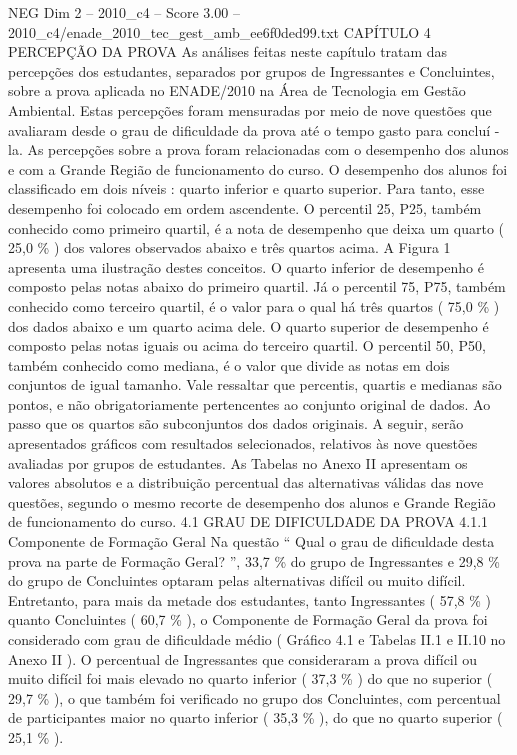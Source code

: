 \begin{textsample}{NEG Dim 2 – 2010\_c4 – Score 3.00 – 2010\_c4/enade\_2010\_tec\_gest\_amb\_ee6f0ded99.txt}  \label{ex:f2_neg_285}
CAPÍTULO 4 PERCEPÇÃO DA PROVA As análises feitas neste capítulo tratam das percepções dos estudantes, separados por grupos de Ingressantes e Concluintes, sobre a prova aplicada no ENADE/2010 na Área de Tecnologia em Gestão Ambiental.
Estas percepções foram mensuradas por meio de nove questões que avaliaram desde o grau de dificuldade da prova até o tempo gasto para concluí -la.
As percepções sobre a prova foram relacionadas com o desempenho dos alunos e com a Grande Região de funcionamento do curso.
O desempenho dos alunos foi classificado em dois níveis : quarto inferior e quarto superior.
Para tanto, esse desempenho foi colocado em ordem ascendente.
O percentil 25, P25, também conhecido como primeiro quartil, é a nota de desempenho que deixa um quarto ( 25,0 \% ) dos valores observados abaixo e três quartos acima.
A Figura 1 apresenta uma ilustração destes conceitos.
O quarto inferior de desempenho é composto pelas notas abaixo do primeiro quartil.
Já o percentil 75, P75, também conhecido como terceiro quartil, é o valor para o qual há três quartos ( 75,0 \% ) dos dados abaixo e um quarto acima dele.
O quarto superior de desempenho é composto pelas notas iguais ou acima do terceiro quartil.
O percentil 50, P50, também conhecido como mediana, é o valor que divide as notas em dois conjuntos de igual tamanho.
Vale ressaltar que percentis, quartis e medianas são pontos, e não obrigatoriamente pertencentes ao conjunto original de dados.
Ao passo que os quartos são subconjuntos dos dados originais.
A seguir, serão apresentados gráficos com resultados selecionados, relativos às nove questões avaliadas por grupos de estudantes.
As Tabelas no Anexo II apresentam os valores absolutos e a distribuição percentual das alternativas válidas das nove questões, segundo o mesmo recorte de desempenho dos alunos e Grande Região de funcionamento do curso. 4.1 GRAU DE DIFICULDADE DA PROVA 4.1.1 Componente de Formação Geral Na questão “ Qual o grau de dificuldade desta prova na parte de Formação Geral? ”, 33,7 \% do grupo de Ingressantes e 29,8 \% do grupo de Concluintes optaram pelas alternativas difícil ou muito difícil.
Entretanto, para mais da metade dos estudantes, tanto Ingressantes ( 57,8 \% ) quanto Concluintes ( 60,7 \% ), o Componente de Formação Geral da prova foi considerado com grau de dificuldade médio ( Gráfico 4.1 e Tabelas II.1 e II.10 no Anexo II ).
O percentual de Ingressantes que consideraram a prova difícil ou muito difícil foi mais elevado no quarto inferior ( 37,3 \% ) do que no superior ( 29,7 \% ), o que também foi verificado no grupo dos Concluintes, com percentual de participantes maior no quarto inferior ( 35,3 \% ), do que no quarto superior ( 25,1 \% ).

\end{textsample}
